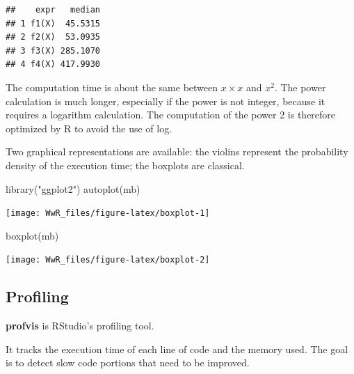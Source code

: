 \documentclass[
  12pt,
  american,
  a4paper,
  extrafontsizes,onecolumn,openright
  ]{memoir}
\newenvironment{Shaded}{\begin{snugshade}}{\end{snugshade}}
\newcommand{\FunctionTok}[1]{\textcolor[rgb]{0.00,0.00,0.00}{#1}}
\newcommand{\NormalTok}[1]{#1}
\newcommand{\StringTok}[1]{\textcolor[rgb]{0.31,0.60,0.02}{#1}}
\begin{document}
\begin{verbatim}
##    expr   median
## 1 f1(X)  45.5315
## 2 f2(X)  53.0935
## 3 f3(X) 285.1070
## 4 f4(X) 417.9930
\end{verbatim}

\normalsize

The computation time is about the same between \(x \times x\) and \(x^2\).
The power calculation is much longer, especially if the power is not integer, because it requires a logarithm calculation.
The computation of the power 2 is therefore optimized by R to avoid the use of log.

Two graphical representations are available: the violins represent the probability density of the execution time; the boxplots are classical.

\scriptsize

\begin{Shaded}
\begin{Highlighting}[]
\FunctionTok{library}\NormalTok{(}\StringTok{"ggplot2"}\NormalTok{)}
\FunctionTok{autoplot}\NormalTok{(mb)}
\end{Highlighting}
\end{Shaded}

\begin{center}\texttt{[image: WwR\_files/figure-latex/boxplot-1]} \end{center}

\begin{Shaded}
\begin{Highlighting}[]
\FunctionTok{boxplot}\NormalTok{(mb)}
\end{Highlighting}
\end{Shaded}

\begin{center}\texttt{[image: WwR\_files/figure-latex/boxplot-2]} \end{center}

\normalsize

\hypertarget{profiling}{%
\subsection{Profiling}\label{profiling}}

\textbf{profvis} is RStudio's profiling tool.

It tracks the execution time of each line of code and the memory used.
The goal is to detect slow code portions that need to be improved.

\scriptsize
\end{document}

